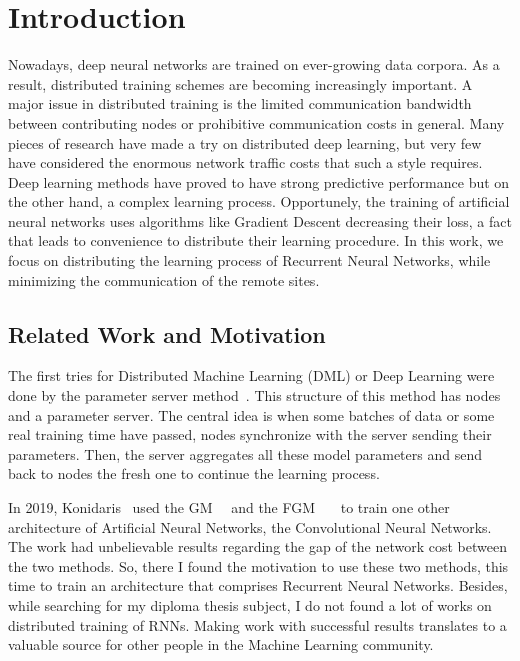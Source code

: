 \chapter{Introduction}\label{ch:introduction}

Nowadays, deep neural networks are trained on ever-growing data corpora.
As a result, distributed training schemes are becoming increasingly important.
A major issue in distributed training is the limited communication bandwidth between contributing nodes or prohibitive communication costs in general.
Many pieces of research have made a try on distributed deep learning, but very few have considered the enormous network traffic costs that such a style requires.
Deep learning methods have proved to have strong predictive performance but on the other hand, a complex learning process.
Opportunely, the training of artificial neural networks uses algorithms like Gradient Descent decreasing their loss, a fact that leads to convenience to distribute their learning procedure.
In this work, we focus on distributing the learning process of Recurrent Neural Networks, while minimizing the communication of the remote sites.

\section{Related Work and Motivation}\label{sec:related-work-and-motivation}

The first tries for Distributed Machine Learning (DML) or Deep Learning were done by the parameter server method~\cite{li_scaling_2014}.
This structure of this method has nodes and a parameter server.
The central idea is when some batches of data or some real training time have passed, nodes synchronize with the server sending their parameters.
Then, the server aggregates all these model parameters and send back to nodes the fresh one to continue the learning process.

In 2019, Konidaris~\cite{konidaris_distributed_2019} used the GM~\cite{sharfman_geometric_2007}~\cite{sharfman_aggregate_2007}
and the FGM~\cite{garofalakis_sketch-based_2013}~\cite{garofalakis_distributed_nodate}~\cite{samoladas_functional_nodate} to train one other architecture of Artificial Neural Networks, the Convolutional Neural Networks.
The work had unbelievable results regarding the gap of the network cost between the two methods.
So, there I found the motivation to use these two methods, this time to train an architecture that comprises Recurrent Neural Networks.
Besides, while searching for my diploma thesis subject, I do not found a lot of works on distributed training of RNNs.
Making work with successful results translates to a valuable source for other people in the Machine Learning community.

